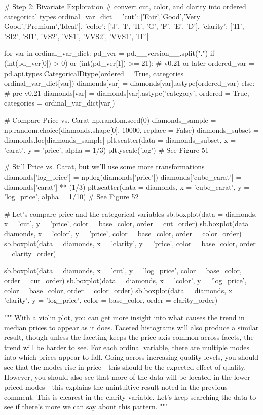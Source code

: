 \begin{python}
	# Step 2: Bivariate Exploration
	# convert cut, color, and clarity into ordered categorical types
	ordinal_var_dict = {'cut': ['Fair','Good','Very Good','Premium','Ideal'],
		'color': ['J', 'I', 'H', 'G', 'F', 'E', 'D'],
		'clarity': ['I1', 'SI2', 'SI1', 'VS2', 'VS1', 'VVS2', 'VVS1', 'IF']}
	
	
	for var in ordinal_var_dict:
		pd_ver = pd.__version__.split(".")
		if (int(pd_ver[0]) > 0) or (int(pd_ver[1]) >= 21): # v0.21 or later
			ordered_var = pd.api.types.CategoricalDtype(ordered = True,
			categories = ordinal_var_dict[var])
			diamonds[var] = diamonds[var].astype(ordered_var)
		else: # pre-v0.21
			diamonds[var] = diamonds[var].astype('category', ordered = True,
			categories = ordinal_var_dict[var])
	
	
	# Compare Price vs. Carat
	np.random.seed(0)
	diamonds_sample = np.random.choice(diamonds.shape[0], 10000, replace = False)
	diamonds_subset = diamonds.loc[diamonds_sample]
	plt.scatter(data = diamonds_subset, x = 'carat', y = 'price', alpha = 1/3)
	plt.yscale('log')
	# See Figure 51
	
	# Still Price vs. Carat, but we'll use some more transformations
	diamonds['log_price'] = np.log(diamonds['price'])
	diamonds['cube_carat'] = diamonds['carat'] ** (1/3)
	plt.scatter(data = diamonds, x = 'cube_carat', y = 'log_price', alpha = 1/10)
	# See Figure 52
	
	# Let's compare price and the categorical variables
	sb.boxplot(data = diamonds, x = 'cut', y = 'price', color = base_color, order = cut_order)
	sb.boxplot(data = diamonds, x = 'color', y = 'price', color = base_color, order = color_order)
	sb.boxplot(data = diamonds, x = 'clarity', y = 'price', color = base_color, order = clarity_order)
	
	sb.boxplot(data = diamonds, x = 'cut', y = 'log_price', color = base_color, order = cut_order)
	sb.boxplot(data = diamonds, x = 'color', y = 'log_price', color = base_color, order = color_order)
	sb.boxplot(data = diamonds, x = 'clarity', y = 'log_price', color = base_color, order = clarity_order)
	
	"""
	With a violin plot, you can get more insight into what causes the trend in median prices to appear as it does.
	Faceted histograms will also produce a similar result, though unless the faceting keeps the price axis common across facets,
	the trend will be harder to see. For each ordinal variable, there are multiple modes into which prices appear to fall.
	Going across increasing quality levels, you should see that the modes rise in price - this should be
	the expected effect of quality. However, you should also see that more of the data will be located in the lower-priced
	modes - this explains the unintuitive result noted in the previous comment. This is clearest in the clarity variable.
	Let's keep searching the data to see if there's more we can say about this pattern.
	"""
	

\end{python}

